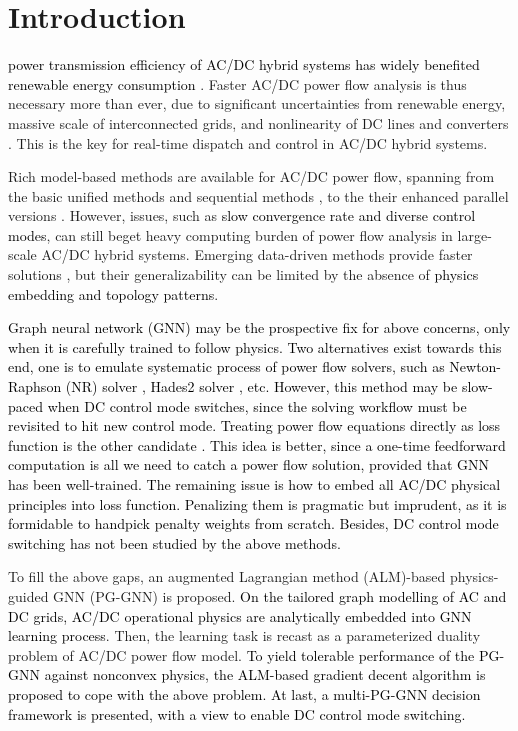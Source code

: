 \documentclass[lettersize,journal]{IEEEtran}
\begin{document}
\section{Introduction}
 \textcolor{black}{power transmission efficiency of AC/DC hybrid systems has widely benefited renewable energy consumption \cite{r1}}. Faster AC/DC power flow analysis is thus necessary more than ever, due to significant uncertainties from renewable energy, massive scale of interconnected grids, and nonlinearity of DC lines and converters \cite{r2}. This is the key for real-time dispatch and control in AC/DC hybrid systems.

Rich model-based methods are available for AC/DC power flow, spanning from the basic unified methods \cite{r3} and sequential methods \cite{r3a}, to the their enhanced parallel versions \cite{r2, r4}. However, issues, such as \textcolor{black}{slow convergence rate and diverse control modes}, can still beget heavy computing burden of power flow analysis in large-scale AC/DC hybrid systems. Emerging data-driven methods provide faster solutions \cite{r5, r6, r7}, but their generalizability can be limited by the absence of \textcolor{black}{physics embedding and topology patterns}. 

\textcolor{black}{Graph neural network (GNN) may be the prospective fix for above concerns, only when it is carefully trained to follow physics. Two alternatives exist towards this end, one is to emulate systematic process of power flow solvers, such as Newton-Raphson (NR) solver \cite{r11}, Hades2 solver \cite{r9}, etc. However, this method may be slow-paced when DC control mode switches, since the solving workflow must be revisited to hit new control mode. Treating power flow equations directly as loss function is the other candidate \cite{r10}. This idea is better, since a one-time feedforward computation is all we need to catch a power flow solution, provided that GNN has been well-trained. The remaining issue is how to embed all AC/DC physical principles into loss function. Penalizing them is pragmatic but imprudent, as it is formidable to handpick penalty weights from scratch. Besides, DC control mode switching has not been studied by the above methods.} 

To fill the above gaps, an augmented Lagrangian method (ALM)-based physics-guided GNN (PG-GNN) is proposed. \textcolor{black}{On the tailored graph modelling of AC and DC grids, AC/DC operational physics are analytically embedded into GNN learning process}. Then, the learning task is recast as a parameterized duality problem of AC/DC power flow model. \textcolor{black}{To yield tolerable performance of the PG-GNN against nonconvex physics, the ALM-based gradient decent algorithm is proposed to cope with the above problem. At last, a multi-PG-GNN decision framework is presented, with a view to enable DC control mode switching.} 
\end{document}
